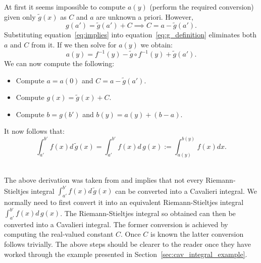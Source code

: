\documentclass[twoside,reqno,11pt]{fcaa-var} %
\begin{document}
\noindent
At first it seems impossible to compute $a(y)$ (perform the required conversion) given only $\widetilde{g}(x)$ as $C$ and $a$ are unknown a priori. However, 
\begin{equation}
\label{eq:implies}
g(a') = \widetilde{g}(a') + C \implies C = a - \widetilde{g}(a'). 
\end{equation}
Substituting equation~\eqref{eq:implies} into equation~\eqref{eq:g_definition} eliminates both $a$ and $C$ from it. If we then solve for $a(y)$ we obtain:
\begin{equation}
a(y) = f^{-1}(y)-\widetilde{g}\circ f^{-1}(y) + \widetilde{g}(a'). 
\end{equation}
We can now compute the following:
\begin{itemize}
\item Compute $a = a(0)$ and $C = a - \widetilde{g}(a')$.
\item Compute $g(x) = \widetilde{g}(x) + C$.
\item Compute $b = g(b')$ and $b(y) = a(y) + (b-a)$.
\end{itemize}
It now follows that: 
\begin{equation}
\int_{a'}^{b'} f(x)d\,\widetilde{g}(x) = \int_{a'}^{b'} f(x)d\,g(x):=\int_{a(y)}^{b(y)}f(x)dx. 
\end{equation}\

\noindent
The above derivation was taken from \cite{grobler19} and implies that not every Riemann-Stieltjes integral $\int_{a'}^{b'} f(x) d\,\widetilde{g}(x)$ can be converted into a Cavalieri integral. We normally need to first convert it into an equivalent Riemann-Stieltjes integral $\int_{a'}^{b'} f(x) d\,g(x)$. The Riemann-Stieltjes integral so obtained can then be converted into a Cavalieri integral. The former conversion is achieved by computing the real-valued constant $C$. Once $C$ is known the latter conversion follows trivially. The above steps should be clearer to the reader once they have worked through the example presented in Section~\ref{sec:cav_integral_example}.\\

\end{document}
